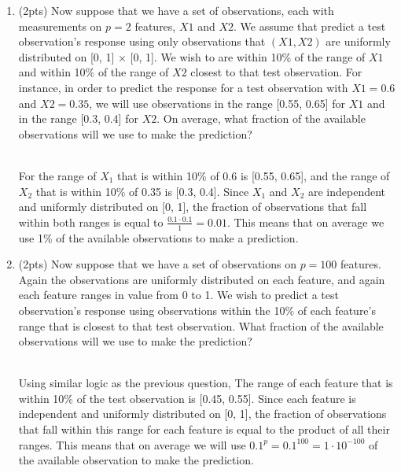 \documentclass[a4paper]{article}
\theoremstyle{definition}
\newenvironment{soln}{
    \leavevmode\color{blue}\ignorespaces
}{}
\begin{document}
\begin{enumerate}
\begin{enumerate}
	
	\item (2pts) Now suppose that we have a set of observations, each with measurements on $p =2$ features, $X1$ and $X2$. We assume that predict a test observation’s response using only observations that $(X1,X2)$ are uniformly distributed on [0, 1] × [0, 1]. We wish to are within 10\% of the range of $X1$ and within 10\% of the range of $X2$ closest to that test observation. For instance, in order to predict the response for a test observation with $X1 =0.6$ and $X2 =0.35$, we will use observations in the range [0.55, 0.65] for $X1$ and in the range [0.3, 0.4] for $X2$. On average, what fraction of the available observations will we use to make the prediction?
	\\\\
	\begin{soln}
            For the range of $X_1$ that is within 10\% of 0.6 is [0.55, 0.65], and the range of $X_2$ that is within 10\% of 0.35 is [0.3, 0.4]. Since $X_1$ and $X_2$ are independent and uniformly distributed on [0, 1], the fraction of observations that fall within both ranges is equal to $\frac{0.1\cdot0.1}{1} = 0.01$. This means that on average we use 1\% of the available observations to make a prediction.
        \end{soln}\\
	
	\item (2pts) Now suppose that we have a set of observations on $p = 100$ features. Again the observations are uniformly distributed on each feature, and again each feature ranges in value from 0 to 1. We wish to predict a test observation’s response using observations within the 10\% of each feature’s range that is closest to that test observation. What fraction of the available observations will we use to make the prediction?
	\\\\
	\begin{soln}
            Using similar logic as the previous question, The range of each feature that is within 10\% of the test observation is [0.45, 0.55]. Since each feature is independent and uniformly distributed on [0, 1], the fraction of observations that fall within this range for each feature is equal to the product of all their ranges. This means that on average we will use $0.1^p = 0.1^{100} = 1 \cdot 10^{-100}$ of the available observation to make the prediction.
        \end{soln}\\
	

\end{enumerate}
\end{enumerate}
\end{document}
